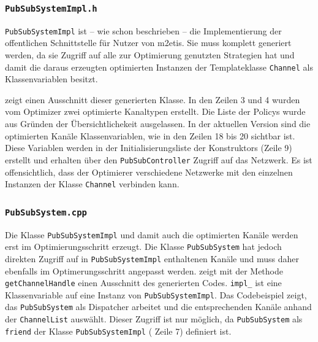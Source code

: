 


\subsubsection*{\texttt{PubSubSystemImpl.h}}
\texttt{PubSubSystemImpl} ist -- wie schon beschrieben -- die Implementierung der offentlichen Schnittstelle für Nutzer von \ac{m2etis}. Sie muss komplett generiert werden, da sie Zugriff auf alle zur Optimierung genutzten Strategien hat und damit die daraus erzeugten optimierten Instanzen der Templateklasse \texttt{Channel} als Klassenvariablen besitzt.

 zeigt einen Ausschnitt dieser generierten Klasse. In den Zeilen 3 und 4 wurden vom Optimizer zwei optimierte Kanaltypen erstellt. Die Liste der Policys wurde aus Gründen der Übersichtlichekeit ausgelassen. In der aktuellen Version sind die optimierten Kanäle Klassenvariablen, wie in den Zeilen 18 bis 20 sichtbar ist.  Diese Variablen werden in der Initialisierungsliste der Konstruktors (Zeile 9) erstellt und erhalten über den \texttt{PubSubController} Zugriff auf das Netzwerk. Es ist offensichtlich, dass der Optimierer verschiedene Netzwerke mit den einzelnen Instanzen der Klasse \texttt{Channel} verbinden kann.




\subsubsection*{\texttt{PubSubSystem.cpp}}
Die Klasse \texttt{PubSubSystemImpl} und damit auch die optimierten Kanäle werden erst im Optimierungsschritt erzeugt. Die Klasse \texttt{PubSubSystem} hat jedoch direkten Zugriff auf in \texttt{PubSubSystemImpl} enthaltenen Kanäle und muss daher ebenfalls im Optimerungsschritt angepasst werden.  zeigt mit der Methode \texttt{getChannelHandle} einen Ausschnitt des generierten Codes. \texttt{impl\_} ist eine Klassenvariable auf eine Instanz von \texttt{PubSubSystemImpl}. Das Codebeispiel zeigt, das \texttt{PubSubSystem} als Dispatcher arbeitet und die entsprechenden Kanäle anhand der \texttt{ChannelList} auswählt. Dieser Zugriff ist nur möglich, da \texttt{PubSubSystem} als \texttt{friend} der Klasse \texttt{PubSubSystemImpl} ( Zeile 7) definiert ist.

